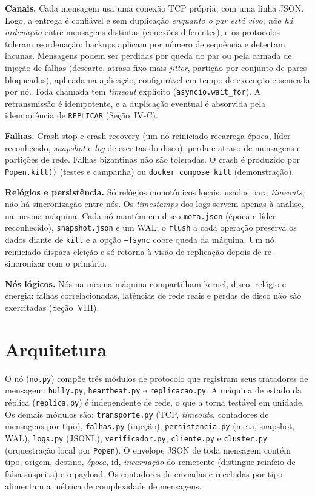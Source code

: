 \documentclass[conference,a4paper]{IEEEtran}
\begin{document}
\textbf{Canais.} Cada mensagem usa uma conexão TCP própria, com uma linha
JSON. Logo, a entrega é confiável e sem duplicação \emph{enquanto o par está
vivo}; \emph{não há ordenação} entre mensagens distintas (conexões
diferentes), e os protocolos toleram reordenação: backups aplicam por número
de sequência e detectam lacunas. Mensagens podem ser perdidas por queda do
par ou pela camada de injeção de falhas (descarte, atraso fixo mais
\emph{jitter}, partição por conjunto de pares bloqueados), aplicada na
aplicação, configurável em tempo de execução e semeada por nó. Toda chamada
tem \emph{timeout} explícito (\texttt{asyncio.wait\_for}). A retransmissão
é idempotente, e a duplicação eventual é absorvida pela idempotência de
\texttt{REPLICAR} (Seção~IV-C).

\textbf{Falhas.} Crash-stop e crash-recovery (um nó reiniciado recarrega
época, líder reconhecido, \emph{snapshot} e \emph{log} de escritas do
disco), perda e atraso de mensagens e partições de rede. Falhas bizantinas
não são toleradas. O crash é produzido por \texttt{Popen.kill()} (testes e
campanha) ou \texttt{docker compose kill} (demonstração).

\textbf{Relógios e persistência.} Só relógios monotônicos locais, usados
para \emph{timeouts}; não há sincronização entre nós. Os \emph{timestamps}
dos logs servem apenas à análise, na mesma máquina. Cada nó mantém em
disco \texttt{meta.json} (época e líder reconhecido), \texttt{snapshot.json}
e um WAL; o \texttt{flush} a cada operação preserva os dados diante de
\texttt{kill} e a opção \texttt{--fsync} cobre queda da máquina. Um nó
reiniciado dispara eleição e só retorna à visão de replicação depois de
re-sincronizar com o primário.

\textbf{Nós lógicos.} Nós na mesma máquina compartilham kernel, disco, relógio
e energia: falhas correlacionadas, latências de rede reais e perdas de disco
não são exercitadas (Seção~VIII).

\section{Arquitetura}

O nó (\texttt{no.py}) compõe três módulos de protocolo que registram seus
tratadores de mensagem: \texttt{bully.py}, \texttt{heartbeat.py} e
\texttt{replicacao.py}. A máquina de estado da réplica (\texttt{replica.py}) é
independente de rede, o que a torna testável em unidade. Os demais módulos são:
\texttt{transporte.py} (TCP, \emph{timeouts}, contadores de mensagens por
tipo), \texttt{falhas.py} (injeção), \texttt{persistencia.py} (meta, snapshot,
WAL), \texttt{logs.py} (JSONL), \texttt{verificador.py}, \texttt{cliente.py}
e \texttt{cluster.py} (orquestração local por \texttt{Popen}). O envelope
JSON de toda mensagem contém tipo, origem, destino, \emph{época}, id,
\emph{incarnação} do remetente (distingue reinício de falsa suspeita) e o
payload. Os contadores de enviadas e recebidas por tipo alimentam a métrica
de complexidade de mensagens.
\end{document}
